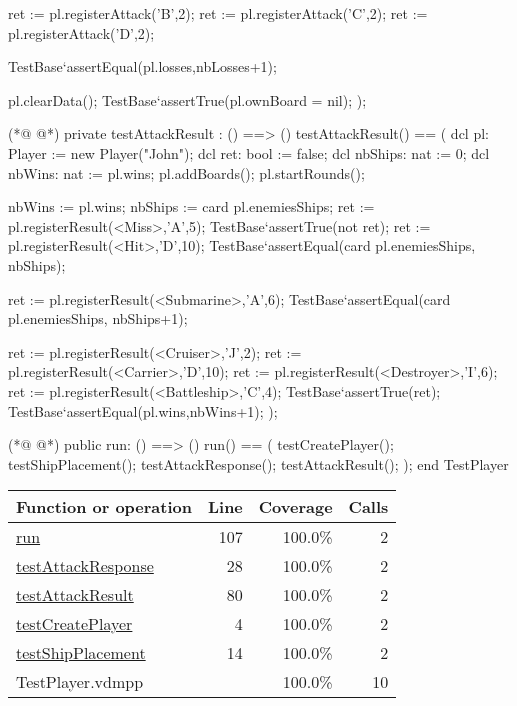 \begin{vdmpp}[breaklines=true]
   ret := pl.registerAttack('B',2);
   ret := pl.registerAttack('C',2);
   ret := pl.registerAttack('D',2);
   
   TestBase`assertEqual(pl.losses,nbLosses+1);
   
   pl.clearData();
   TestBase`assertTrue(pl.ownBoard = nil);
 );
 
(*@
\label{testAttackResult:80}
@*)
 private testAttackResult : () ==> ()
  testAttackResult() == (
   dcl pl: Player := new Player("John");
   dcl ret: bool := false;
   dcl nbShips: nat := 0;
   dcl nbWins: nat := pl.wins;
   pl.addBoards();
   pl.startRounds();
   
   nbWins := pl.wins;
   nbShips := card pl.enemiesShips;
   ret := pl.registerResult(<Miss>,'A',5);
   TestBase`assertTrue(not ret);
   ret := pl.registerResult(<Hit>,'D',10);
   TestBase`assertEqual(card pl.enemiesShips, nbShips);
   
   ret := pl.registerResult(<Submarine>,'A',6);
   TestBase`assertEqual(card pl.enemiesShips, nbShips+1);
   
   ret := pl.registerResult(<Cruiser>,'J',2);
   ret := pl.registerResult(<Carrier>,'D',10);
   ret := pl.registerResult(<Destroyer>,'I',6);
   ret := pl.registerResult(<Battleship>,'C',4);
   TestBase`assertTrue(ret);
   TestBase`assertEqual(pl.wins,nbWins+1);
 );
 
(*@
\label{run:107}
@*)
 public run: () ==> ()
  run() == (
   testCreatePlayer();
   testShipPlacement();
   testAttackResponse();
   testAttackResult();
 );
end TestPlayer
\end{vdmpp}
\bigskip
\begin{longtable}{|l|r|r|r|}
\hline
Function or operation & Line & Coverage & Calls \\
\hline
\hline
\hyperref[run:107]{run} & 107&100.0\% & 2 \\
\hline
\hyperref[testAttackResponse:28]{testAttackResponse} & 28&100.0\% & 2 \\
\hline
\hyperref[testAttackResult:80]{testAttackResult} & 80&100.0\% & 2 \\
\hline
\hyperref[testCreatePlayer:4]{testCreatePlayer} & 4&100.0\% & 2 \\
\hline
\hyperref[testShipPlacement:14]{testShipPlacement} & 14&100.0\% & 2 \\
\hline
\hline
TestPlayer.vdmpp & & 100.0\% & 10 \\
\hline
\end{longtable}

